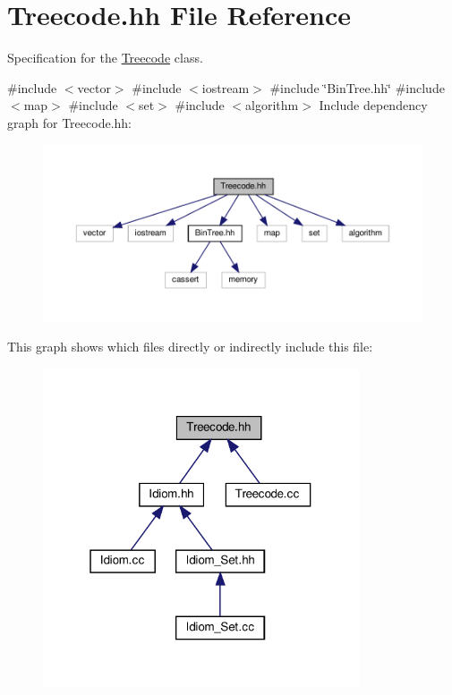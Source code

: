 \hypertarget{Treecode_8hh}{}\section{Treecode.\+hh File Reference}
\label{Treecode_8hh}


Specification for the \hyperlink{classTreecode}{Treecode} class.  


{\ttfamily \#include $<$vector$>$}\newline
{\ttfamily \#include $<$iostream$>$}\newline
{\ttfamily \#include \char`\"{}Bin\+Tree.\+hh\char`\"{}}\newline
{\ttfamily \#include $<$map$>$}\newline
{\ttfamily \#include $<$set$>$}\newline
{\ttfamily \#include $<$algorithm$>$}\newline
Include dependency graph for Treecode.\+hh\+:
\nopagebreak
\begin{figure}[H]
\begin{center}
\leavevmode
\includegraphics[width=350pt]{Treecode_8hh__incl}
\end{center}
\end{figure}
This graph shows which files directly or indirectly include this file\+:
\nopagebreak
\begin{figure}[H]
\begin{center}
\leavevmode
\includegraphics[width=265pt]{Treecode_8hh__dep__incl}
\end{center}
\end{figure}
